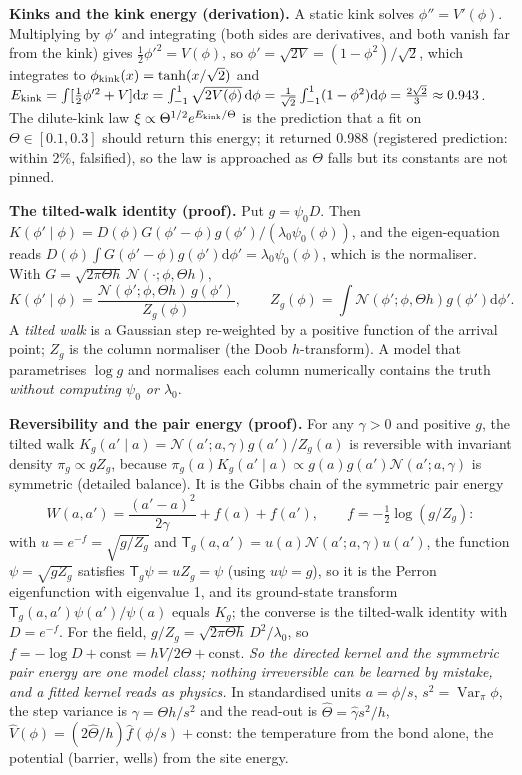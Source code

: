 \textbf{Kinks and the kink energy (derivation).} A static kink solves $\phi''=V'(\phi)$. Multiplying by $\phi'$ and integrating (both sides are derivatives, and both vanish far from the kink) gives $\tfrac12\phi'^2=V(\phi)$, so $\phi'=\sqrt{2V}=(1-\phi^2)/\sqrt2$, which integrates to
$\phi_{\rm kink}(x)=\tanh(x/\sqrt2)$ and $E_{\rm kink}=\int[\tfrac12\phi'^2+V]\mathrm dx=\int_{-1}^{1}\sqrt{2V(\phi)}\,\mathrm d\phi=\frac1{\sqrt2}\int_{-1}^1(1-\phi^2)\mathrm d\phi=\frac{2\sqrt2}{3}\approx0.943$.
The dilute-kink law $\xi\propto\Theta^{1/2}e^{E_{\rm kink}/\Theta}$ is the prediction that a fit on $\Theta\in[0.1,0.3]$ should return this energy; it returned 0.988 (registered prediction: within 2\%, falsified), so the law is approached as $\Theta$ falls but its constants are not pinned.

\textbf{The tilted-walk identity (proof).} Put $g=\psi_0D$. Then $K(\phi'\mid\phi)=D(\phi)G(\phi'-\phi)g(\phi')/(\lambda_0\psi_0(\phi))$, and the eigen-equation reads $D(\phi)\int G(\phi'-\phi)g(\phi')\mathrm d\phi'=\lambda_0\psi_0(\phi)$, which is the normaliser. With $G=\sqrt{2\pi\Theta h}\,\mathcal N(\cdot;\phi,\Theta h)$,
\begin{equation}\label{eq:tilted}
K(\phi'\mid\phi)=\frac{\mathcal N(\phi';\phi,\Theta h)\,g(\phi')}{Z_g(\phi)},\qquad Z_g(\phi)=\int\mathcal N(\phi';\phi,\Theta h)g(\phi')\mathrm d\phi'.
\end{equation}
A \emph{tilted walk} is a Gaussian step re-weighted by a positive function of the arrival point; $Z_g$ is the column normaliser (the Doob $h$-transform). A model that parametrises $\log g$ and normalises each column numerically contains the truth \emph{without computing $\psi_0$ or $\lambda_0$}.

\textbf{Reversibility and the pair energy (proof).} For any $\gamma>0$ and positive $g$, the tilted walk $K_g(a'\mid a)=\mathcal N(a';a,\gamma)g(a')/Z_g(a)$ is reversible with invariant density $\pi_g\propto gZ_g$, because
$\pi_g(a)K_g(a'\mid a)\propto g(a)g(a')\mathcal N(a';a,\gamma)$ is symmetric (detailed balance). It is the Gibbs chain of the symmetric pair energy
\begin{equation}\label{eq:pair-energy}
W(a,a')=\frac{(a'-a)^2}{2\gamma}+f(a)+f(a'),\qquad f=-\tfrac12\log(g/Z_g):
\end{equation}
with $u=e^{-f}=\sqrt{g/Z_g}$ and $\mathsf T_g(a,a')=u(a)\mathcal N(a';a,\gamma)u(a')$, the function $\psi=\sqrt{gZ_g}$ satisfies $\mathsf T_g\psi=uZ_g=\psi$ (using $u\psi=g$), so it is the Perron eigenfunction with eigenvalue 1, and its ground-state transform $\mathsf T_g(a,a')\psi(a')/\psi(a)$ equals $K_g$; the converse is the tilted-walk identity with $D=e^{-f}$.
For the field, $g/Z_g=\sqrt{2\pi\Theta h}\,D^2/\lambda_0$, so $f=-\log D+\text{const}=hV/2\Theta+\text{const}$. \emph{So the directed kernel and the symmetric pair energy are one model class; nothing irreversible can be learned by mistake, and a fitted kernel reads as physics.} In standardised units $a=\phi/s$, $s^2=\operatorname{Var}_\pi\phi$,
the step variance is $\gamma=\Theta h/s^2$ and the read-out is $\hat\Theta=\hat\gamma s^2/h$, $\hat V(\phi)=(2\hat\Theta/h)\hat f(\phi/s)+\text{const}$: the temperature from the bond alone, the potential (barrier, wells) from the site energy.

